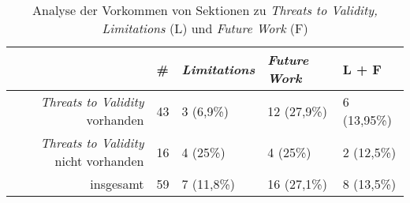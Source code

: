 \begin{table}[h!]
    \begin{tabular}{ r | l | l | l  | l }
        & \# & \textit{Limitations} & \textit{Future Work} & L + F   \\
        \hline
        \textit{Threats to Validity} vorhanden & 43 & 3 (6,9\%) & 12 (27,9\%) & 6 (13,95\%) \\
        \textit{Threats to Validity} nicht vorhanden & 16 & 4 (25\%) & 4 (25\%)& 2 (12,5\%)\\
        insgesamt & 59 & 7 (11,8\%) & 16 (27,1\%) & 8 (13,5\%)\\
    \end{tabular}
    \caption{Analyse der Vorkommen von Sektionen zu \textit{Threats to Validity, Limitations} (L) und \textit{Future Work} (F)}
    \label{table:sektionen}
\end{table}
